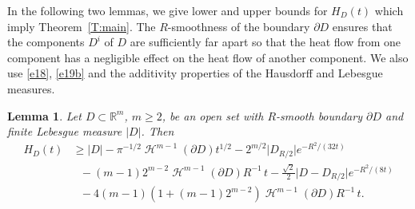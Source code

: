\documentclass[a4paper,9pt]{amsart}
\newtheorem{lemma}[theorem]{Lemma}
\begin{document}
In the following two lemmas, we give lower and upper bounds for
$H_{D}(t)$ which imply Theorem~\ref{T:main}. The $R$-smoothness of
the boundary $\partial D$ ensures that the components $D^{i}$ of
$D$ are sufficiently far apart so that the heat flow from one
component has a negligible effect on the heat flow of another
component. We also use \eqref{e18}, \eqref{e19b} and the additivity
properties of the Hausdorff and Lebesgue measures.
\begin{lemma}\label{L:lowerhc}
Let $D \subset \mathbb{R}^{m}$, $m \geq 2$, be an open set with $R$-smooth boundary $\partial D$ and finite Lebesgue
measure $\vert D \vert$. Then
\begin{align*}
H_{D}(t) &\geq \vert D \vert - \pi^{-1/2}\operatorname{\mathcal{H}}^{m-1}(\partial
D)t^{1/2} - 2^{m/2} \big\vert D_{R/2} \big\vert
e^{-R^{2}/(32t)}\nonumber \\ &\ \ \ -
(m-1)2^{m-2}\operatorname{\mathcal{H}}^{m-1}(\partial D)R^{-1} \, t -
\frac{\sqrt{2}}{2}\big\vert D - D_{R/2} \big\vert
e^{-R^{2}/(8t)}\nonumber \\ &\ \ \  -
4(m-1)(1+(m-1)2^{m-2})\operatorname{\mathcal{H}}^{m-1}(\partial D)R^{-1} \, t.
\end{align*}
\end{lemma}
\end{document}
